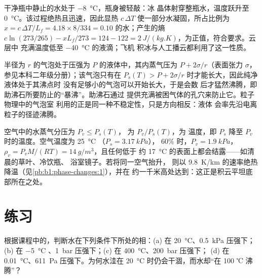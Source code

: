 \begin{example}[过冷的瓶子]\label{ex:b1:phase-changes:supercooled}
干净瓶中静止的水处于 \qty{-8}{\degreeCelsius}，瓶身被轻敲：冰
晶体射穿整瓶水，温度跃升至
\qty{0}{\degreeCelsius}。该过程绝热且迅速，因此显热
$c\,\Delta T$ 使一部分水凝固，所占比例为 $x = c\,\Delta T/L_f = 4.18 \times 8/334 =
0.10$ 的水；产生的熵 $c\ln(273/265) - xL_f/273 =
124 - 122 = \qty{+2}{J/(kg.K)}$，为正值，符合要求。云层中
充满温度低至 \qty{-40}{\degreeCelsius} 的液滴；飞机
积冰与人工播云都利用了这一性质。
\end{example}

\begin{remark}[助沸石与气泡室]\label{rem:b1:phase-changes:nucleation}
半径为 $r$ 的气泡处于压强为 $P$ 的液体中，其内蒸气压为
$P + 2\sigma/r$（表面张力 $\sigma$，参见本科二年级分册）；该气泡只有在
$P_s(T) > P + 2\sigma/r$ 时才能长大，因此纯净液体处于其沸点时
没有足够小的气泡可以开始长大，于是会数
后才猛然沸腾，即助沸石所要防止的“暴沸”。助沸石通过
提供充满被困气体的孔穴来防止它。粒子物理中的气泡室
利用的正是同一种不稳定性，只是方向相反：液体
会率先沿电离粒子的径迹沸腾。
\end{remark}

\begin{example}[湿度与结露]\label{ex:b1:phase-changes:dew}
空气中的水蒸气分压为 $P_v \leq P_s(T)$，
\emph{}为 $P_v/P_s(T)$，\emph{}为
温度，即 $P_s$ 降至 $P_v$ 时的温度。空气温度为 \qty{25}{\degreeCelsius}
（$P_s = \qty{3.17}{kPa}$）， $60\%$ 时，$P_v = \qty{1.9}{kPa}$，
$\rho_v = P_vM/(RT) = \qty{14}{g/m^3}$，且任何低于
约 \qty{17}{\degreeCelsius} 的表面上都会结露——如清晨的草叶、冷饮瓶、
浴室镜子。若将同一空气抬升，
则以 \qty{9.8}{K/km} 的速率绝热降温（见\cref{pb:b1:phase-changes:1}），并在
约一千米高处达到：这正是积云平坦底部所在之处。
\end{example}

\section{练习}

\begin{exercise}[$\star$]\label{exo:b1:phase-changes:1}
根据课程中的，判断水在下列条件下所处的相：(a) 在
\qty{20}{\degreeCelsius}、\qty{0.5}{kPa} 压强下；(b) 在 \qty{-5}{\degreeCelsius}
、\qty{1}{bar} 压强下；(c) 在 \qty{400}{\degreeCelsius}、\qty{200}{bar} 压强下；
(d) 在 \qty{0.01}{\degreeCelsius}、\qty{611}{Pa} 压强下。为何水洼在
\qty{20}{\degreeCelsius} 时仍会干涸，而水却“在 100 ℃ 沸腾”？
\end{exercise}

